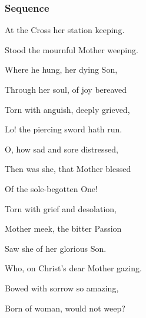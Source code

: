 \subsubsection{Sequence}\label{dolorosa}

\vspace{-1\baselineskip}

\begin{multicols}{2}
\begin{hangparas}{1.25em}{1}
%
%

At the Cross her station keeping.

Stood the mournful Mother weeping.

Where he hung, her dying Son,%

\vspace{0.75\baselineskip}

Through her soul, of joy bereaved

Torn with anguish, deeply grieved,

Lo! the piercing sword hath run.%

\vspace{0.75\baselineskip}

O, how sad and sore distressed,

Then was she, that Mother blessed

Of the sole-begotten One!%

\vspace{0.75\baselineskip}

Torn with grief and desolation,

Mother meek, the bitter Passion

Saw she of her glorious Son.%

\vspace{0.75\baselineskip}

Who, on Christ's dear Mother gazing.

Bowed with sorrow so amazing,

Born of woman, would not weep?%

\vspace{0.75\baselineskip}


\end{hangparas}
\end{multicols}
